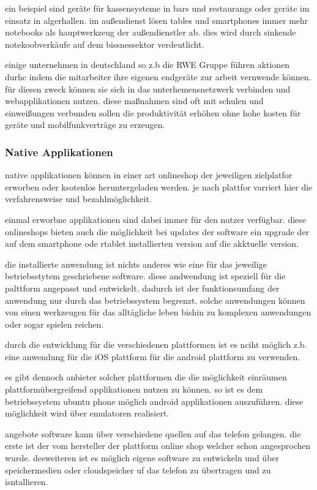 ein beispiel sind geräte für kassensysteme in bars und restaurangs oder geräte im einsatz in algerhallen. im außendienst lösen tables und smartphones immer mehr notebooks als hauptwerkzeug der außendienstler ab. dies wird durch sinkende notekoobverkäufe auf dem bissnessektor verdeutlicht.

einige unternehmen in deutschland so z.b die RWE Gruppe führen aktionen durhc indem die mitarbeiter ihre eigenen endgeräte zur arbeit vernwende können. für diesen zweck können sie sich in das unterhemensnetzwerk verbinden und webapplikationen nutzen. diese maßnahmen sind oft mit schulen und einweißungen verbunden sollen die produktivität erhöhen ohne hohe kosten für geräte und mobilfunkverträge zu erzeugen.

\subsubsection{Native Applikationen}
\label{natand}

native applikationen können in einer art onlineshop der jeweiligen zielplatfor erworben oder ksotenlos heruntergeladen werden. je nach plattfor varriert hier die verfahrensweise und bezahlmöglichkeit.

einmal erworbne applikationen sind dabei immer für den nutzer verfügbar. diese onlineshops bieten auch die möglichkeit bei updates der software ein upgrade der auf dem smartphone ode rtablet installierten version auf die akktuelle version.

die installierte anwendung ist nichts anderes wie eine für das jeweilige betriebsstytem geschriebene software. diese andwendung ist speziell für die palttform angepasst und entwickelt. dadurch ist der funktionsumfang der anwendung nur durch das betriebssystem begrenzt. solche anwendungen können von einen werkzeugen für das alltägliche leben bishin zu komplexen anwendungen oder sogar spielen reichen.

durch die entwicklung für die verschiedenen plattformen ist es nciht möglich z.b. eine anwendung für die iOS plattform für die android plattform zu verwenden.

es gibt dennoch anbieter solcher plattformen die die möglichkeit einräumen plattformübergreifend applikationen nutzen zu können. so ist es dem betriebssystem ubuntu phone möglich android applikationen auszuführen. diese möglichkeit wird über emulatoren realisiert. 

angebote software kann über verschiedene quellen auf das telefon gelangen. die erste ist der vom hersteller der plattform online shop welcher schon angesprochen wurde. desweiteren ist es möglich eigene software zu entwickeln und über speichermedien oder cloudspeicher uf das telefon zu übertragen und zu isntallieren.

